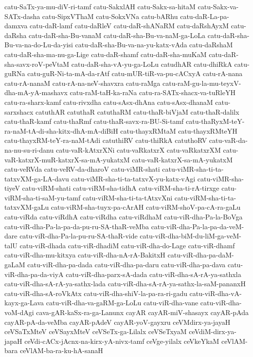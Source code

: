 {catu-SaTx-ya-mu-diV-ri-tamf
catu-SakxlAH
catu-Sakx-sa-hitaM
catu-Sakx-va-SATx-dasha
catu-SipxVThaM
catu-SokxVNa
catu-bARhu
catu-daR-La-pa-damxva
catu-daR-lamf
catu-daRleV
catu-daR-shANaRM
catu-daRshAyxM
catu-daRsha
catu-daR-sha-Bu-vanaM
catu-daR-sha-Bu-va-naM-ga-LoLa
catu-daR-sha-Bu-va-na-do-Lu-da-yisi
catu-daR-sha-Bu-va-na-yu-katx-vAda
catu-daRshaM
catu-daR-sha-ma-nu-ga-Lige
catu-daR-shamf
catu-daR-sha-muKaM
catu-daR-sha-savx-roV-peVtaM
catu-daR-sha-vA-yu-ga-LoLu
catudhAR
catu-dhiRkA
catu-guRNa
catu-guR-Ni-ta-mA-da-rAtf
catu-mUR-tiR-va-pu-cACxyA
catu-rA-nana
catu-rA-nanaM
catu-rA-na-neV-shavxra
catu-raMga
catu-raM-gu-la-mu-teyxV-dha-mA-yA-mashavx
catu-raM-taH-ka-raNa
catu-ra-SATx-shacx-va-tuRleYH
catu-ra-sharx-kamf
catu-rivxdha
catu-sAsx-dhAna
catu-sAsx-dhanaM
catu-sarxshacx
catuthAR
catuthaR
catuthaRM
catu-thaR-biVjaM
catu-thaR-dalilx
catu-thaR-kamf
catu-thaRmf
catu-thaR-savx-ra-BU-Si-tamf
catu-thaRyxM-teY-ra-naM-tA-di-sha-kitx-dhA-mA-diBiH
catu-thayxRMtaM
catu-thayxRMteYH
catu-thayxRM-teY-ra-naM-tAdi
catuthiRV
catu-thiRkA
catuthoRV
catu-vaR-da-na-nu-su-ri-danu
catu-vaR-kAtxrXNi
catu-vaRkatxrX
catu-vaRkatxrXM
catu-vaR-katxrX-muR-katxrX-sa-mA-yukatxM
catu-vaR-katxrX-sa-mA-yukatxM
catu-veRVda
catu-veRV-da-dharoV
catu-viMR-shati
catu-viMR-sha-ti-ta-tatxvXM-ga-LA-davu
catu-viMR-sha-ti-ta-tatxvX-yu-katx-vAgi
catu-viMR-sha-tiyeV
catu-viRM-shati
catu-viRM-sha-tidhA
catu-viRM-sha-ti-rA-tirxge
catu-viRM-sha-ti-saM-yu-tamf
catu-viRM-sha-ti-ta-tAtxvXni
catu-viRM-sha-ti-ta-tatxvXM-gaLu
catu-viRM-sha-tuyx-pa-cArAH
catu-viRM-shoV-pa-cA-ra-gaLu
catu-viRda
catu-viRdhA
catu-viRdha
catu-viRdhaM
catu-viR-dha-Pa-la-BoVga
catu-viR-dha-Pa-la-pa-da-pu-ru-SA-thaR-veMba
catu-viR-dha-Pa-la-pa-da-veM-dare
catu-viR-dha-Pa-la-pu-ru-SA-thaR-vide
catu-viR-dha-biM-du-liM-ga-veM-talU
catu-viR-dhada
catu-viR-dhadiM
catu-viR-dha-do-Lage
catu-viR-dhamf
catu-viR-dha-mu-kitxya
catu-viR-dha-nA-rA-BakitxH
catu-viR-dha-pa-daM-gaLaM
catu-viR-dha-pa-dada
catu-viR-dha-pa-daru
catu-viR-dha-pa-dava
catu-viR-dha-pa-da-viyA
catu-viR-dha-parx-sA-dada
catu-viR-dha-sA-rA-ya-sathxla
catu-viR-dha-sA-rA-ya-sathx-lada
catu-viR-dha-sA-rA-ya-sathx-la-saM-pananxH
catu-viR-dha-sA-roVkAtx
catu-viR-dha-shiV-la-pa-ra-ri-gadu
catu-viR-dha-vA-kayx-ga-Lava
catu-viR-dha-va-gaRM-ga-LoLu
catu-viR-dha-vane
catu-viR-dha-voM-dAgi
cava-gAR-kaSx-ra-ga-Lanunx
cayAR
cayAR-miV-shasayx
cayAR-pAda
cayAR-pA-da-veMba
cayAR-pAdeV
cayAR-yoV-gayxru
ceVMdirx-ya-jayaH
ceVSaTxMteV
ceVSayxMteV
ceVSeTx-ga-Lilalx
ceVSeTxyaM
ceVdiM-dirx-ya-japaH
ceVdi-cACx-jAcnx-na-kirx-yA-nivx-tamf
ceVge-yilalx
ceVkeYkaM
ceVlAM-bara
ceVlAM-ba-ra-ku-hA-sanaH
}
